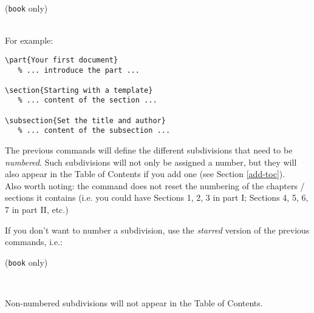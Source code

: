 
 (\texttt{book} only)


 \\


For example:
\begin{lstlisting}
\part{Your first document}
   % ... introduce the part ...
   
\section{Starting with a template}
   % ... content of the section ...

\subsection{Set the title and author}
   % ... content of the subsection ...
\end{lstlisting} 

\bigskip

The previous commands will define the different subdivisions that need to be \emph{numbered}.
Such subdivisions will not only be assigned a number, but they will also appear in the Table of Contents if you add one (see Section \ref{add-toc}). \\

Also worth noting: the  command does not reset the numbering of the chapters / sections it contains (i.e. you could have Sections 1, 2, 3 in part I; Sections 4, 5, 6, 7 in part II, etc.)

\bigskip

If you don't want to number a subdivision, use the \emph{starred} version of the previous commands, i.e.:


 (\texttt{book} only)


 \\


\begin{note}
Non-numbered subdivisions will not appear in the Table of Contents.
\end{note}


\newpage

